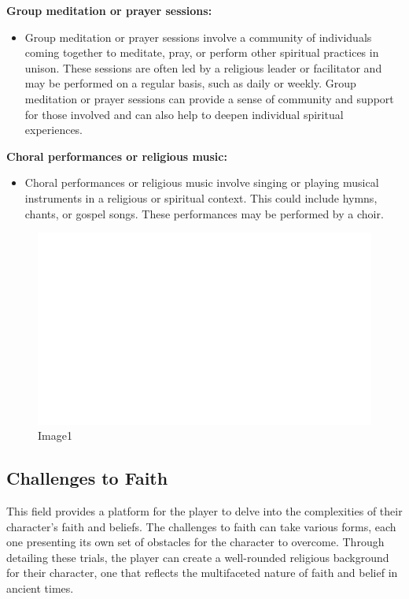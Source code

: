 \textbf{Group meditation or prayer sessions:}

\begin{itemize}
\tightlist
\item
  Group meditation or prayer sessions involve a community of individuals
  coming together to meditate, pray, or perform other spiritual
  practices in unison. These sessions are often led by a religious
  leader or facilitator and may be performed on a regular basis, such as
  daily or weekly. Group meditation or prayer sessions can provide a
  sense of community and support for those involved and can also help to
  deepen individual spiritual experiences.
\end{itemize}

\textbf{Choral performances or religious music:}

\begin{itemize}
\tightlist
\item
  Choral performances or religious music involve singing or playing
  musical instruments in a religious or spiritual context. This could
  include hymns, chants, or gospel songs. These performances may be
  performed by a choir.
\end{itemize}

\begin{figure}
\centering
\includegraphics{./images/religion05.svg}
\caption{Image1}
\end{figure}

\hypertarget{challenges-to-faith}{%
\subsection{Challenges to Faith}\label{challenges-to-faith}}

This field provides a platform for the player to delve into the
complexities of their character's faith and beliefs. The challenges to
faith can take various forms, each one presenting its own set of
obstacles for the character to overcome. Through detailing these trials,
the player can create a well-rounded religious background for their
character, one that reflects the multifaceted nature of faith and belief
in ancient times.

